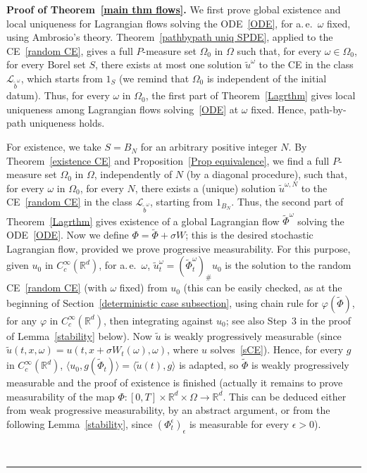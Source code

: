 \documentclass[a4paper,10pt]{article}
\newenvironment{proof}[1][Proof]{\noindent\textbf{#1.} }{\ \rule{0.5em}{0.5em}}
\newcommand{\mr}{\mathbb{R}}
\newcommand{\mc}{\mathcal}
\newcommand{\lan}{\langle}
\newcommand{\ran}{\rangle}
\newcommand{\td}{\tilde}
\newcommand{\eps}{\epsilon}
\begin{document}
\begin{proof}[Proof of Theorem~\ref{main thm flows}]
We first prove global existence and local uniqueness for Lagrangian flows solving the ODE~\eqref{ODE}, for a.\,e.\ $\omega$ fixed, using Ambrosio's theory. Theorem~\ref{pathbypath uniq SPDE}, applied to the CE~\eqref{random CE}, gives a full $P$-measure set $\Omega_0$ in $\Omega$ such that, for every $\omega \in \Omega_0$, for every Borel set $S$, there exists at most one solution $\td{u}^\omega$ to the CE in the class $\mc{L}_{\td{b}^\omega}$, which starts from $1_S$ (we remind that $\Omega_0$ is independent of the initial datum). Thus, for every $\omega$ in $\Omega_0$, the first part of Theorem~\ref{Lagrthm} gives local uniqueness among Lagrangian flows solving~\eqref{ODE} at $\omega$ fixed. Hence, path-by-path uniqueness holds.

For existence, we take $S=B_N$ for an arbitrary positive integer $N$. By Theorem~\ref{existence CE} and Proposition~\ref{Prop equivalence}, we find a full $P$-measure set $\Omega_0$ in $\Omega$, independently of $N$ (by a diagonal procedure), such that, for every $\omega$ in $\Omega_0$, for every $N$, there exists a (unique) solution $\td{u}^{\omega,N}$ to the CE~\eqref{random CE} in the class $\mc{L}_{\td{b}^\omega}$, starting from $1_{B_N}$. Thus, the second part of Theorem~\ref{Lagrthm} gives existence of a global Lagrangian flow $\td{\Phi}^\omega$ solving the ODE~\eqref{ODE}.
Now we define $\Phi=\td{\Phi}+\sigma W$; this is the desired stochastic Lagrangian flow, provided we prove progressive measurability. For this purpose, given $u_0$ in $C^\infty_c(\mr^d)$, for a.\,e.\ $\omega$, $\td{u}^\omega_t=(\td{\Phi}^\omega_t)_\#u_0$ is the solution to the random CE~\eqref{random CE} (with $\omega$ fixed) from $u_0$ (this can be easily checked, as at the beginning of Section~\ref{deterministic case subsection}, using chain rule for $\varphi(\td{\Phi})$, for any $\varphi$ in $C^\infty_c(\mr^d)$, then integrating against $u_0$; see also Step~3 in the proof of Lemma~\ref{stability} below). Now $\td{u}$ is weakly progressively measurable (since $\td{u}(t,x,\omega)=u(t,x+\sigma W_t(\omega),\omega)$, where $u$ solves~\eqref{sCE}). Hence, for every $g$ in $C^\infty_c(\mr^d)$, $\lan u_0,g(\td{\Phi}_t)\ran=\lan\td{u}(t),g\ran$ is adapted, so $\td{\Phi}$ is weakly progressively measurable and the proof of existence is finished (actually it remains to prove measurability of the map $\Phi:[0,T]\times\mr^d\times\Omega\rightarrow\mr^d$. This can be deduced either from weak progressive measurability, by an abstract argument, or from the following Lemma~\ref{stability}, since $(\Phi^\eps_t)_\eps$ is measurable for every $\eps>0$).


\end{proof}
\end{document}
